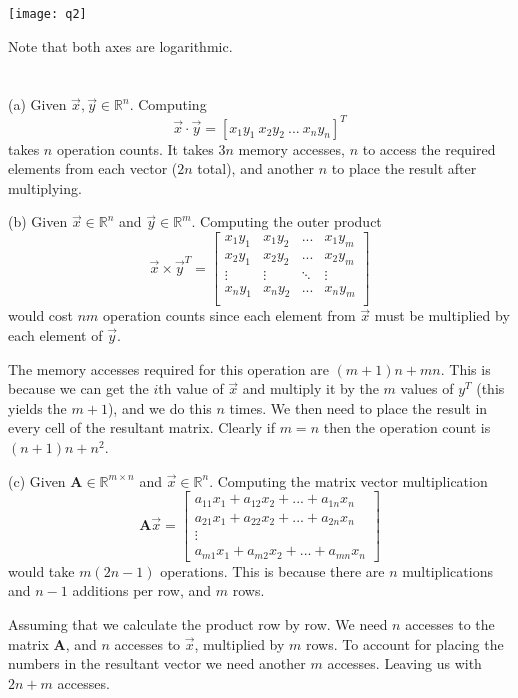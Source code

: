 \documentclass{article}
\newcommand{\R}{\mathbb{R}}
\begin{document}
\texttt{[image: q2]}

Note that both axes are logarithmic.


\section{} %
 (a) Given $\vec{x}, \vec{y} \in \R^n$. Computing
$$\vec{x} \cdot \vec{y} = [x_1y_1 \ x_2y_2 \ ... \ x_ny_n]^T$$
takes $n$ operation counts. It takes $3n$ memory accesses, $n$ to access
the required elements from each vector ($2n$ total), and another $n$
to place the result after multiplying.

(b) Given $\vec{x} \in \R^n$ and $\vec{y} \in \R^m$. Computing the outer product
$$\vec{x} \times \vec{y}^T =
    \begin{bmatrix}
        x_1y_1 & x_1y_2 & ...    & x_1y_m \\
        x_2y_1 & x_2y_2 & ...    & x_2y_m \\
        \vdots & \vdots & \ddots & \vdots \\
        x_ny_1 & x_ny_2 & ...    & x_ny_m \\
    \end{bmatrix} $$
would cost $nm$ operation counts since each element from $\vec{x}$ must be
multiplied by each element of $\vec{y}$.

The memory accesses required for this operation are $(m + 1)n + mn$. This is because
we can get the $i$th value of $\vec{x}$ and multiply it by the $m$ values of $y^T$
(this yields the $m+1$), and we do this $n$ times. We then need to place the result
in every cell of the resultant matrix. Clearly if $m=n$ then the operation
count is $(n+1)n + n^2$.

(c) Given $\bm{A} \in \R^{m\times n}$ and $\vec{x} \in \R^n$. Computing the
matrix vector multiplication
$$\bm{A}\vec{x} = \begin{bmatrix}
        a_{11}x_1 + a_{12}x_2 + ...    + a_{1n}x_n \\
        a_{21}x_1 + a_{22}x_2 + ...    + a_{2n}x_n \\
        \vdots                                     \\
        a_{m1}x_1 + a_{m2}x_2 + ...    + a_{mn}x_n
    \end{bmatrix}$$
would take $m(2n-1)$ operations. This is because there are $n$ multiplications
and $n-1$ additions per row, and $m$ rows.

Assuming that we calculate the product row by row. We need $n$ accesses to the
matrix $\bm{A}$, and $n$ accesses to $\vec{x}$, multiplied by $m$ rows. To
account for placing the numbers in the resultant vector we need another $m$
accesses. Leaving us with $2n + m$ accesses.
\end{document}
